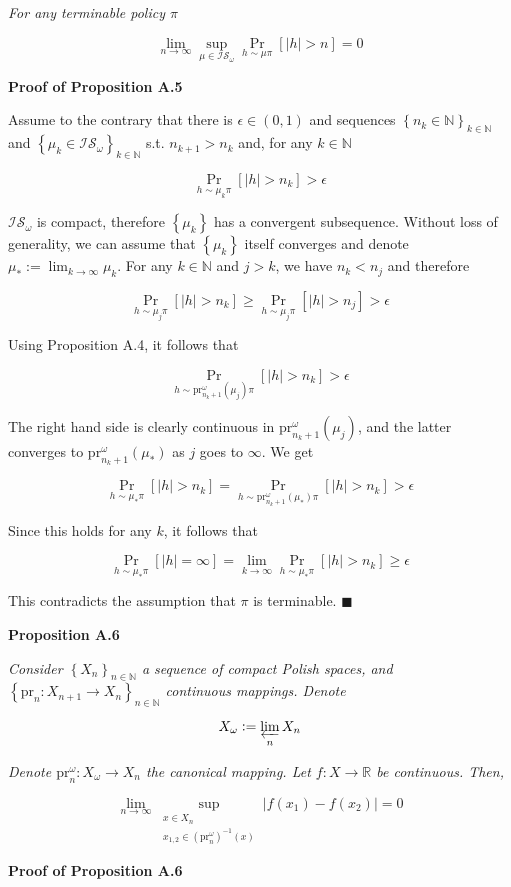 \documentclass[a4paper]{article}
\newcommand{\Co}[1]{}
\newcommand{\AP}[1]{\left(#1\right)}
\newcommand{\AB}[1]{\left[#1\right]}
\newcommand{\AC}[1]{\left\{#1\right\}}
\newcommand{\Abs}[1]{\left\vert #1 \right\vert}
\newcommand{\Pa}[2]{\underset{#1}{\operatorname{Pr}}\AB{#2}}
\newcommand{\Nats}{\mathbb{N}}
\newcommand{\Reals}{\mathbb{R}}
\newcommand{\Lim}[1]{\lim_{#1 \rightarrow \infty}}
\newcommand{\IS}{\mathcal{IS}}
\newcommand{\Prj}{\mathrm{pr}}
\newcommand{\Prjo}{\mathrm{pr}^\omega_n}
\begin{document}
\textit{For any terminable policy $\pi$}\Co{i}

$$\Lim{n}\sup_{\mu\in\IS_\omega}\Pa{h\sim\mu\pi}{\Abs{h}>n}=0$$

\textbf{Proof of Proposition A.5}\Co{b}

Assume to the contrary that there is $\epsilon\in(0,1)$ and sequences $\AC{n_k\in\Nats}_{k\in\Nats}$ and $\AC{\mu_k\in\IS_\omega}_{k\in\Nats}$ s.t. $n_{k+1} > n_k$ and, for any $k\in\Nats$

$$\Pa{h\sim\mu_k\pi}{\Abs{h}>n_k} > \epsilon$$

$\IS_\omega$ is compact, therefore $\AC{\mu_k}$ has a convergent subsequence. Without loss of generality, we can assume that $\AC{\mu_k}$ itself converges and denote $\mu_*:=\Lim{k}\mu_k$. For any $k\in\Nats$ and $j > k$, we have $n_k < n_j$ and therefore

$$\Pa{h\sim\mu_j\pi}{\Abs{h}>n_k} \geq \Pa{h\sim\mu_j\pi}{\Abs{h}>n_j} > \epsilon$$

Using Proposition A.4, it follows that

$$\Pa{h\sim\Prj^\omega_{n_k+1}\AP{\mu_j}\pi}{\Abs{h}>n_k} > \epsilon$$

The right hand side is clearly continuous in $\Prj^\omega_{n_k+1}\AP{\mu_j}$, and the latter converges to $\Prj^\omega_{n_k+1}\AP{\mu_*}$ as $j$ goes to $\infty$. We get

$$\Pa{h\sim\mu_*\pi}{\Abs{h}>n_k}=\Pa{h\sim\Prj^\omega_{n_k+1}\AP{\mu_*}\pi}{\Abs{h}>n_k} > \epsilon$$

Since this holds for any $k$, it follows that

$$\Pa{h\sim\mu_*\pi}{\Abs{h}=\infty}=\Lim{k}\Pa{h\sim\mu_*\pi}{\Abs{h}>n_k} \geq \epsilon$$

This contradicts the assumption that $\pi$ is terminable. $\blacksquare$

\textbf{Proposition A.6}\Co{b}

\textit{Consider $\AC{X_n}_{n\in\Nats}$ a sequence of compact Polish spaces, and $\AC{\Prj_n:X_{n+1}\rightarrow X_n}_{n\in\Nats}$ continuous mappings. Denote}\Co{i}

$$X_\omega:=\varprojlim_n X_n$$

\textit{Denote $\Prjo:X_\omega\rightarrow X_n$ the canonical mapping. Let $f:X\rightarrow\Reals$ be continuous. Then,}\Co{i}

$$\Lim{n}\sup_{\substack{x\in X_n\\x_{1,2}\in\AP{\Prjo}^{-1}(x)}}\Abs{f\AP{x_1}-f\AP{x_2}}=0$$

\textbf{Proof of Proposition A.6}\Co{b}
\end{document}
